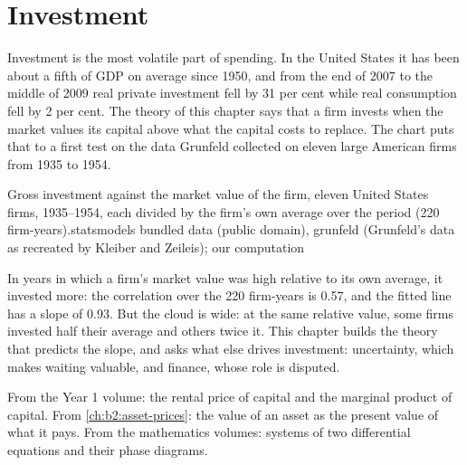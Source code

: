 \chapter{Investment}\label{ch:b2:investment}

Investment is the most volatile part of spending. In the United States it has been about a fifth of GDP on average since
1950, and from the end of 2007 to the middle of 2009 real private investment fell by 31 per cent while real consumption fell
by 2 per cent. The theory of this chapter says that a firm invests when the market values its capital above
what the capital costs to replace. The chart puts that to a first test on the data Grunfeld collected on eleven large
American firms from 1935 to 1954.

\begin{openingchart}{Gross investment against the market value of the firm, eleven United States firms, 1935--1954, each
  divided by the firm's own average over the period (220 firm-years).}{statsmodels bundled data (public domain), grunfeld
  (Grunfeld's data as recreated by Kleiber and Zeileis); our computation}
\end{openingchart}

In years in which a firm's market value was high relative to its own average, it invested more: the correlation over the
220 firm-years is 0.57, and the fitted line has a slope of 0.93. But the cloud is wide: at the same relative value, some
firms invested half their average and others twice it. This chapter builds the theory that predicts the slope, and
asks what else drives investment: uncertainty, which makes waiting valuable, and finance, whose role is disputed.

\begin{recall}
From the Year 1 volume: the rental price of capital and the marginal product of capital. From \cref{ch:b2:asset-prices}: the
value of an asset as the present value of what it pays. From the mathematics volumes: systems of two differential
equations and their phase diagrams.
\end{recall}

